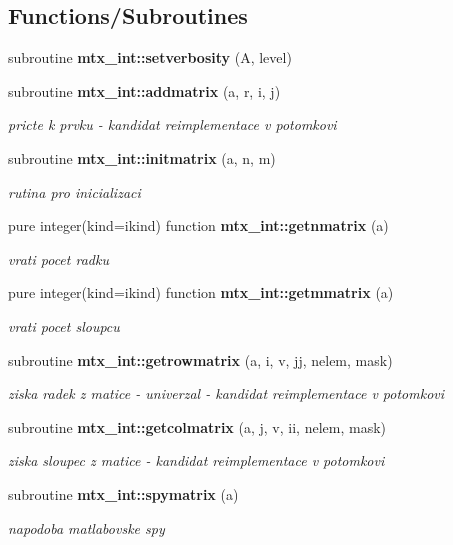 \subsection*{Functions/\+Subroutines}
\begin{DoxyCompactItemize}
\item 
subroutine {\bf mtx\+\_\+int\+::setverbosity} (A, level)
\item 
subroutine {\bf mtx\+\_\+int\+::addmatrix} (a, r, i, j)
\begin{DoxyCompactList}\small\item\em pricte k prvku -\/ kandidat reimplementace v potomkovi \end{DoxyCompactList}\item 
subroutine {\bf mtx\+\_\+int\+::initmatrix} (a, n, m)
\begin{DoxyCompactList}\small\item\em rutina pro inicializaci \end{DoxyCompactList}\item 
pure integer(kind=ikind) function {\bf mtx\+\_\+int\+::getnmatrix} (a)
\begin{DoxyCompactList}\small\item\em vrati pocet radku \end{DoxyCompactList}\item 
pure integer(kind=ikind) function {\bf mtx\+\_\+int\+::getmmatrix} (a)
\begin{DoxyCompactList}\small\item\em vrati pocet sloupcu \end{DoxyCompactList}\item 
subroutine {\bf mtx\+\_\+int\+::getrowmatrix} (a, i, v, jj, nelem, mask)
\begin{DoxyCompactList}\small\item\em ziska radek z matice -\/ univerzal -\/ kandidat reimplementace v potomkovi \end{DoxyCompactList}\item 
subroutine {\bf mtx\+\_\+int\+::getcolmatrix} (a, j, v, ii, nelem, mask)
\begin{DoxyCompactList}\small\item\em ziska sloupec z matice -\/ kandidat reimplementace v potomkovi \end{DoxyCompactList}\item 
subroutine {\bf mtx\+\_\+int\+::spymatrix} (a)
\begin{DoxyCompactList}\small\item\em napodoba matlabovske spy \end{DoxyCompactList}\item 

\end{DoxyCompactItemize}
